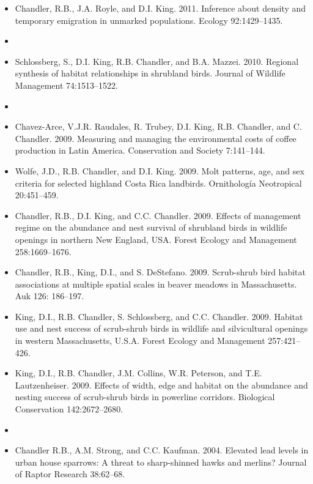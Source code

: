 \begin{itemize}
\item Chandler, R.B., J.A. Royle, and D.I. King. 2011. Inference
  about density and temporary emigration in unmarked
  populations. Ecology 92:1429--1435.


\item[] { \\}

\item Schlossberg, S., D.I. King, R.B. Chandler, and
  B.A. Mazzei. 2010. Regional synthesis of habitat relationships in
  shrubland birds. Journal of Wildlife Management 74:1513--1522.

\item[] { \\}

\item Chavez-Arce, V.J.R. Raudales, R. Trubey, D.I. King,
  R.B. Chandler, and C. Chandler. 2009. Measuring and managing the
  environmental costs of coffee production in Latin
  America. Conservation and Society 7:141--144.

\item Wolfe, J.D., R.B. Chandler, and D.I. King. 2009. Molt
  patterns, age, and sex criteria for selected highland Costa Rica
  landbirds. Ornitholog\'{i}a Neotropical 20:451--459.

\item Chandler, R.B., D.I. King, and C.C. Chandler. 2009. Effects
  of management regime on the abundance and nest survival of shrubland
  birds in wildlife openings in northern New England, USA. Forest
  Ecology and Management 258:1669--1676.

\item Chandler, R.B., King, D.I., and
  S. DeStefano. 2009. Scrub-shrub bird habitat associations at
  multiple spatial scales in beaver meadows in Massachusetts. Auk 126:
  186--197.

\item King, D.I., R.B. Chandler, S. Schlossberg, and
  C.C. Chandler. 2009. Habitat use and nest success of scrub-shrub
  birds in wildlife and silvicultural openings in western
  Massachusetts, U.S.A. Forest Ecology and Management 257:421--426.

\item King, D.I., R.B. Chandler, J.M. Collins, W.R. Peterson, and
  T.E. Lautzenheiser. 2009. Effects of width, edge and habitat on the
  abundance and nesting success of scrub-shrub birds in powerline
  corridors. Biological Conservation 142:2672--2680.

\item[] { \\}

\item Chandler R.B., A.M. Strong, and C.C. Kaufman. 2004. Elevated
  lead levels in urban house sparrows: A threat to sharp-shinned hawks
  and merlins? Journal of Raptor Research 38:62--68.

\end{itemize}



